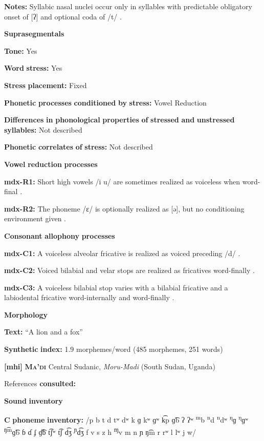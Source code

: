 \begin{styleBody}
\textbf{Notes:} Syllabic nasal nuclei occur only in syllables with predictable obligatory onset of [ʔ] and optional coda of /t/ \citep[41]{Beachy2005}.

\textbf{Suprasegmentals}

\textbf{Tone:} Yes

\textbf{Word} \textbf{stress:} Yes

\textbf{Stress} \textbf{placement:} Fixed

\textbf{Phonetic} \textbf{processes} \textbf{conditioned} \textbf{by} \textbf{stress:} Vowel Reduction

\textbf{Differences} \textbf{in} \textbf{phonological} \textbf{properties} \textbf{of} \textbf{stressed} \textbf{and} \textbf{unstressed} \textbf{syllables:} Not described

\textbf{Phonetic} \textbf{correlates} \textbf{of} \textbf{stress:} Not described

\textbf{Vowel} \textbf{reduction} \textbf{processes}

\textbf{mdx-R1:} Short high vowels /i u/ are sometimes realized as voiceless when word-final \citep[35-6]{Beachy2005}.

\textbf{mdx-R2:} The phoneme /ɛ/ is optionally realized as [ə], but no conditioning environment given \citep[37]{Beachy2005}.

\textbf{Consonant} \textbf{allophony} \textbf{processes}

\textbf{mdx-C1:} A voiceless alveolar fricative is realized as voiced preceding /d/ \citep[26]{Beachy2005}.

\textbf{mdx-C2:} Voiced bilabial and velar stops are realized as fricatives word-finally \citep[17]{Beachy2005}.

\textbf{mdx-C3:} A voiceless bilabial stop varies with a bilabial fricative and a labiodental fricative word-internally and word-finally \citep[17]{Beachy2005}.

\textbf{Morphology}

\textbf{Text:} “A lion and a fox” \citep[154-158]{Beachy2005}

\textbf{Synthetic} \textbf{index:} 1.9 morphemes/word (485 morphemes, 251 words)

\textbf{[mhi]}   \textbf{\textsc{Ma’di}}  Central Sudanic, \textit{Moru-Madi} (South Sudan, Uganda)

References \textbf{consulted:} \citet{BlackingsFabb2003}

\textbf{Sound} \textbf{inventory}

\textbf{C} \textbf{phoneme} \textbf{inventory:} /p b t d tʷ dʷ k ɡ kʷ ɡʷ k͡p ɡ͡b ʔ ʔʷ \textsuperscript{m}b \textsuperscript{n}d \textsuperscript{n}dʷ \textsuperscript{ŋ}ɡ \textsuperscript{ŋ}ɡʷ \textsuperscript{ŋ͡m}ɡ͡b ɓ ɗ ʄ ɠ͡ɓ t͡ʃʷ t͡ʃ d͡ʒ \textsuperscript{ɲ}d͡ʒ f v s z h \textsuperscript{ɱ}v m n ɲ ŋ͡m r rʷ l lʷ j w/


\end{styleBody}
